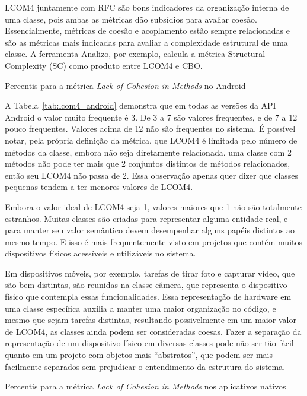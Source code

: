 LCOM4 juntamente com RFC são bons indicadores da organização interna de uma classe, pois ambas as métricas dão subsídios para avaliar coesão. Essencialmente, métricas de coesão e acoplamento estão sempre relacionadas e são as métricas mais indicadas para avaliar a complexidade estrutural de uma classe. A ferramenta Analizo, por exemplo, calcula a métrica Structural Complexity (SC) como produto entre LCOM4 e CBO.

\begin{table}[!htb]

\caption{Percentis para a métrica \textit{Lack of Cohesion in Methods} no Android}
\label{tab:lcom4_android}
\end{table}

A Tabela~\ref{tab:lcom4_android} demonstra que em todas as versões da API Android o valor muito frequente é 3. De 3 a 7 são valores frequentes, e de 7 a 12 pouco frequentes. Valores acima de 12 não são frequentes no sistema. É possível notar, pela própria definição da métrica, que LCOM4 é limitada pelo número de métodos da classe, embora não seja diretamente relacionada. uma classe com 2 métodos não pode ter mais que 2 conjuntos distintos de métodos relacionados, então seu LCOM4 não passa de 2. Essa observação apenas quer dizer que classes pequenas tendem a ter menores valores de LCOM4.

Embora o valor ideal de LCOM4 seja 1, valores maiores que 1 não são totalmente estranhos. Muitas classes são criadas para representar alguma entidade real, e para manter seu valor semântico devem desempenhar alguns papéis distintos ao mesmo tempo. E isso é mais frequentemente visto em projetos que contém muitos dispositivos físicos acessíveis e utilizáveis no sistema. 

Em dispositivos móveis, por exemplo, tarefas de tirar foto e capturar vídeo, que são bem distintas, são reunidas na classe câmera, que representa o dispositivo físico que contempla essas funcionalidades. Essa representação de hardware em uma classe específica auxilia a manter uma maior organização no código, e mesmo que sejam tarefas distintas, resultando possivelmente em um maior valor de LCOM4, as classes ainda podem ser consideradas coesas. Fazer a separação da representação de um dispositivo físico em diversas classes pode não ser tão fácil quanto em um projeto com objetos mais ``abstratos'', que podem ser mais facilmente separados sem prejudicar o entendimento da estrutura do sistema.

\begin{table}[!htb]

\caption{Percentis para a métrica \textit{Lack of Cohesion in Methods} nos aplicativos nativos}
\label{tab:lcom4_apps}
\end{table}

